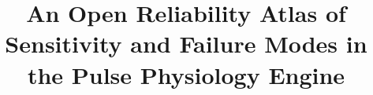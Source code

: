 \documentclass[pdflatex,sn-nature]{sn-jnl}%
\begin{document}

\title[Reliability Atlas: Pulse Physiology Engine]{An Open Reliability Atlas of Sensitivity and Failure Modes in the Pulse Physiology Engine}
\end{document}
